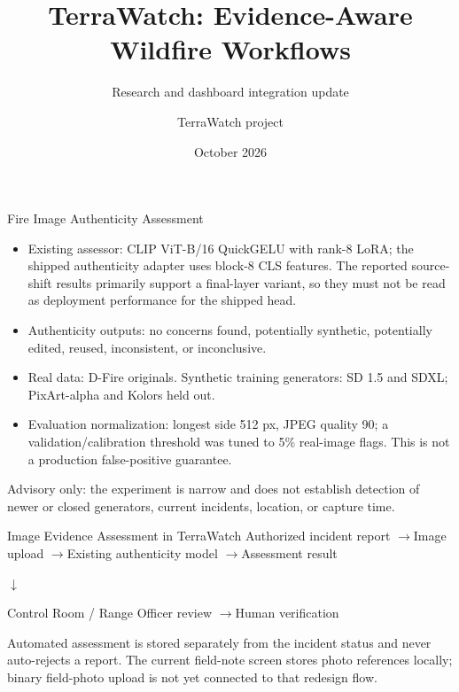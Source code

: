\documentclass[aspectratio=169,10pt]{beamer}
\title{TerraWatch: Evidence-Aware Wildfire Workflows}
\subtitle{Research and dashboard integration update}
\author{TerraWatch project}
\date{October 2026}
\begin{document}
\begin{frame}\titlepage\end{frame}

\begin{frame}{Fire Image Authenticity Assessment}
  \begin{itemize}
    \item Existing assessor: CLIP ViT-B/16 QuickGELU with rank-8 LoRA; the shipped authenticity adapter uses block-8 CLS features. The reported source-shift results primarily support a final-layer variant, so they must not be read as deployment performance for the shipped head.
    \item Authenticity outputs: no concerns found, potentially synthetic, potentially edited, reused, inconsistent, or inconclusive.
    \item Real data: D-Fire originals. Synthetic training generators: SD 1.5 and SDXL; PixArt-alpha and Kolors held out.
    \item Evaluation normalization: longest side 512 px, JPEG quality 90; a validation/calibration threshold was tuned to 5\% real-image flags. This is not a production false-positive guarantee.
  \end{itemize}
  \vfill
  \scriptsize Advisory only: the experiment is narrow and does not establish detection of newer or closed generators, current incidents, location, or capture time.
\end{frame}

\begin{frame}{Image Evidence Assessment in TerraWatch}
  \centering
  \Large Authorized incident report
  \quad$\rightarrow$\quad Image upload
  \quad$\rightarrow$\quad Existing authenticity model
  \quad$\rightarrow$\quad Assessment result

  \vspace{1em}
  \Large$\downarrow$

  \vspace{1em}
  \Large Control Room / Range Officer review
  \quad$\rightarrow$\quad Human verification

  \vfill
  \small Automated assessment is stored separately from the incident status and never auto-rejects a report. The current field-note screen stores photo references locally; binary field-photo upload is not yet connected to that redesign flow.
\end{frame}
\end{document}
